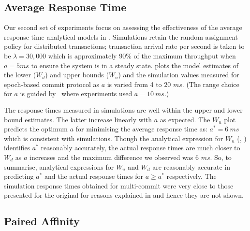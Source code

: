 \subsection{Average Response Time}

Our second set of experiments focus on assessing the effectiveness of the average response time analytical 
models in . Simulations retain the random assignment policy for 
distributed transactions; transaction arrival rate per second is taken to be $\lambda = 30,000$ which is 
approximately 90\% 
of the maximum throughput when $a = 5ms$ to ensure the system is in a steady state.  plots the 
model estimates of the lower ($W_d$) and upper bounds ($W_u$) and the simulation values measured for 
epoch-based commit protocol as $a$ is varied from 4 to 20 $ms$. (The range choice for $a$ is guided
by~\cite{lu} where experiments used $a = 10 ~ms$.)

The response times measured in simulations are well within the upper and lower bound estimates. The latter 
increase linearly with $a$ as expected. The $W_u$ plot predicts the optimum $a$ for minimising the average 
response time as: $a^{*}= 6 ~ms$ which is consistent with simulations.
Though the analytical expression for $W_u$ (, ) identifies $a^{*}$ 
reasonably accurately, the actual response times are much closer to $W_d$ as $a$ increases and the maximum 
difference we observed was 6 $ms$. %
So, to summarise, analytical expressions for $W_u$ and $W_d$ are reasonably accurate in predicting $a^{*}$ 
and the actual response times for $a \geq a^{*} $ respectively. The simulation response times obtained for 
multi-commit were very close to those presented for the original for reasons explained in 
 and hence they are not shown. 




\subsection{Paired Affinity}
\label{sec:trans-saved-per}

